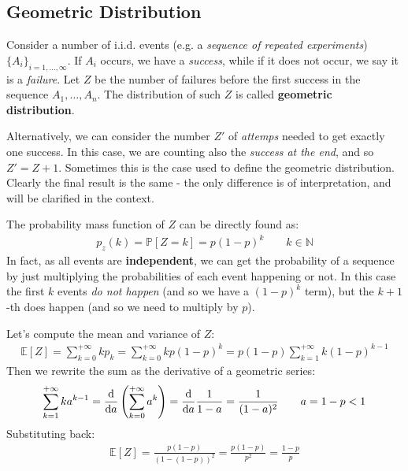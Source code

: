 \documentclass[../template.tex]{subfiles}
\begin{document}
\subsection{Geometric Distribution}
Consider a number of i.i.d. events (e.g. a \textit{sequence of repeated experiments}) $\{A_i\}_{i=1,\dots,\infty}$. If $A_i$ occurs, we have a \textit{success}, while if it does not occur, we say it is a \textit{failure}. Let $Z$ be the number of failures before the first success in the sequence $A_1, \dots, A_n$. The distribution of such $Z$ is called \textbf{geometric distribution}.   

\medskip

Alternatively, we can consider the number $Z'$ of \textit{attemps} needed to get exactly one success. In this case, we are counting also the \textit{success at the end}, and so $Z' = Z+1$. Sometimes this is the case used to define the geometric distribution. Clearly the final result is the same - the only difference is of interpretation, and will be clarified in the context.

\medskip

The probability mass function of $Z$ can be directly found as:
\begin{align*}
    p_z(k) = \mathbb{P}[Z=k] = p(1-p)^k \qquad k\in \mathbb{N}
\end{align*}
In fact, as all events are \textbf{independent}, we can get the probability of a sequence by just multiplying the probabilities of each event happening or not. In this case the first $k$ events \textit{do not happen} (and so we have a $(1-p)^k$ term), but the $k+1$-th does happen (and so we need to multiply by $p$). 

\medskip

Let's compute the mean and variance of $Z$:
\begin{align*}
    \mathbb{E}[Z] = \sum_{k=0}^{+\infty} k p_k = \sum_{k=0}^{+\infty} k p(1-p)^k = p(1-p) \sum_{k=1}^{+\infty} k(1-p)^{k-1}
\end{align*}
Then we rewrite the sum as the derivative of a geometric series:
\begin{align*}
    \sum_{k=1}^{+\infty} ka^{k-1} = \dv{a} \left(\sum_{k=0}^{+\infty} a^k\right) = \dv{a} \frac{1}{1- a} = \frac{1}{(1-a)^2} \qquad a = 1-p < 1
\end{align*}
Substituting back:
\begin{align*}
    \mathbb{E}[Z] = \frac{p(1-p)}{(1-(1-p))^2} = \frac{p(1-p)}{p^2} = \frac{1-p}{p}   
\end{align*}
\end{document}
